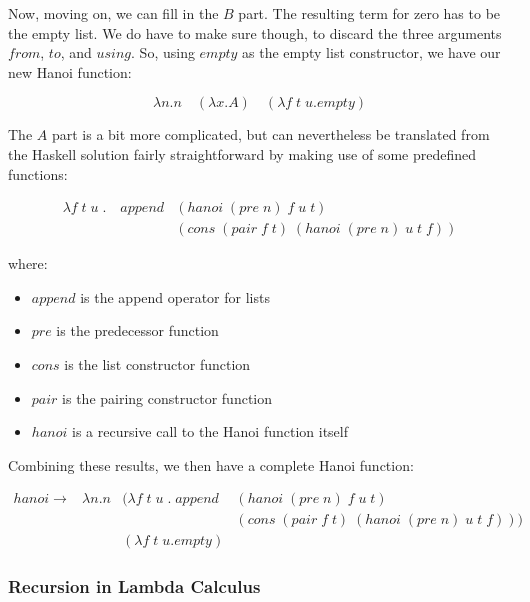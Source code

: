 \documentclass[11pt]{article}
\begin{document}
Now, moving on, we can fill in the $B$ part. The resulting term for zero has to be the empty list. We do have to make sure though, to discard the three arguments $from$, $to$, and $using$. So, using $empty$ as the empty list constructor, we have our new Hanoi function:

\begin{displaymath}
\lambda n.n \quad (\lambda x.A) \quad (\lambda f \; t \; u.empty)
\end{displaymath}

The $A$ part is a bit more complicated, but can nevertheless be translated from the Haskell solution fairly straightforward by making use of some predefined functions:

\begin{displaymath}
\begin{array}{ll}
\lambda f \; t \; u\;. \quad append & (hanoi\;(pre\;n)\;f\;u\;t) \\
& (cons \; (pair\;f\;t) \; (hanoi\;(pre\;n)\;u\;t\;f))
\end{array}
\end{displaymath}

where:

\begin{itemize}
\item $append$ is the append operator for lists
\item $pre$ is the predecessor function
\item $cons$ is the list constructor function
\item $pair$ is the pairing constructor function
\item $hanoi$ is a recursive call to the Hanoi function itself
\end{itemize}

Combining these results, we then have a complete Hanoi function:

\begin{displaymath}
\begin{array}{llll}
hanoi \to & \lambda n.n & ( \lambda f \; t \; u\;. \; append & (hanoi\;(pre\;n)\;f\;u\;t) \\
& & & (cons \; (pair\;f\;t) \; (hanoi\;(pre\;n)\;u\;t\;f)) ) \\
& & (\lambda f \; t \; u.empty) &
\end{array}
\end{displaymath}


\subsubsection{Recursion in Lambda Calculus}
\end{document}
